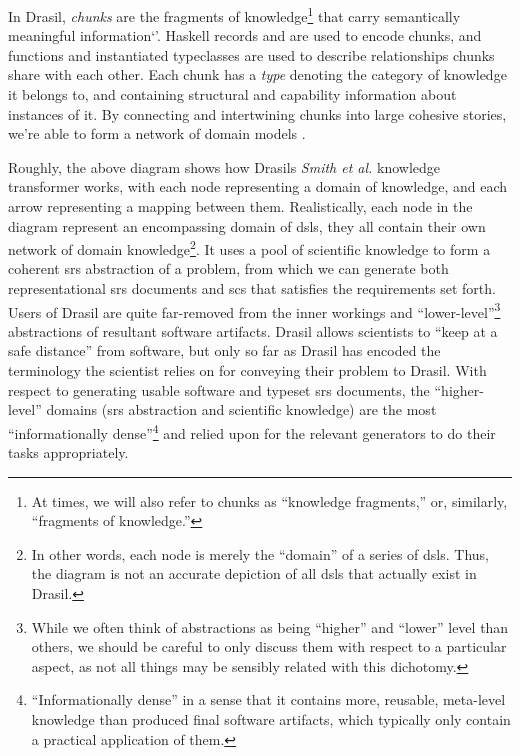 In Drasil, \textit{chunks} are the fragments of knowledge\footnote{At times, we
      will also refer to chunks as ``knowledge fragments,'' or, similarly,
      ``fragments of knowledge.''} that carry semantically meaningful
information`'. Haskell records and  are used to encode chunks,
and functions and instantiated typeclasses are used to describe
relationships chunks share with each other. Each chunk has a \textit{type}
denoting the category of knowledge it belongs to, and containing
structural and capability information about instances of it. By connecting
and intertwining chunks into large cohesive stories, we're able to form a
network of domain models \cite{Czarnecki2005}.

\roughNetworkOfDomains{}

Roughly, the above diagram shows how Drasils \textit{Smith et al.} knowledge
transformer works, with each node representing a domain of knowledge, and each
arrow representing a mapping between them. Realistically, each node in the
diagram represent an encompassing domain of \acsp{dsl}, they all contain their
own network of domain knowledge\footnote{In other words, each node is merely the
      ``domain'' of a series of \acsp{dsl}. Thus, the diagram is not an accurate
      depiction of all \acsp{dsl} that actually exist in Drasil.}. It uses a pool of
scientific knowledge to form a coherent \acs{srs} abstraction of a problem, from
which we can generate both representational \acs{srs} documents and \acs{scs}
that satisfies the requirements set forth. Users of Drasil are quite far-removed
from the inner workings and ``lower-level''\footnote{While we often think of
      abstractions as being ``higher'' and ``lower'' level than others, we should be
      careful to only discuss them with respect to a particular aspect, as not all
      things may be sensibly related with this dichotomy.} abstractions of resultant
software artifacts. Drasil allows scientists to ``keep at a safe distance'' from
software, but only so far as Drasil has encoded the terminology the scientist
relies on for conveying their problem to Drasil. With respect to generating
usable software and typeset \acs{srs} documents, the ``higher-level'' domains
(\acs{srs} abstraction and scientific knowledge) are the most ``informationally
dense''\footnote{``Informationally dense'' in a sense that it contains more,
      reusable, meta-level knowledge than produced final software artifacts, which
      typically only contain a practical application of them.} and relied upon for the
relevant generators to do their tasks appropriately.

